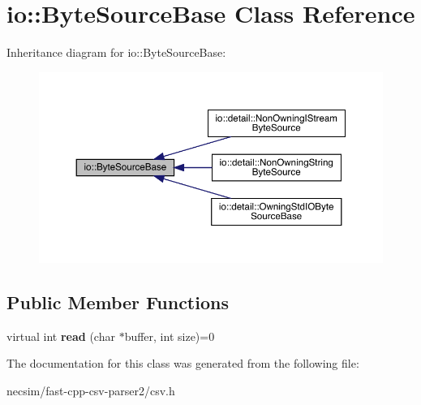 \hypertarget{classio_1_1_byte_source_base}{}\section{io\+:\+:Byte\+Source\+Base Class Reference}
\label{classio_1_1_byte_source_base}


Inheritance diagram for io\+:\+:Byte\+Source\+Base\+:\nopagebreak
\begin{figure}[H]
\begin{center}
\leavevmode
\includegraphics[width=350pt]{classio_1_1_byte_source_base__inherit__graph}
\end{center}
\end{figure}
\subsection*{Public Member Functions}
\begin{DoxyCompactItemize}
\item 
virtual int {\bfseries read} (char $\ast$buffer, int size)=0\hypertarget{classio_1_1_byte_source_base_a9598bcc869b79e44da07f0e6fa478615}{}\label{classio_1_1_byte_source_base_a9598bcc869b79e44da07f0e6fa478615}

\end{DoxyCompactItemize}


The documentation for this class was generated from the following file\+:\begin{DoxyCompactItemize}
\item 
necsim/fast-\/cpp-\/csv-\/parser2/csv.\+h\end{DoxyCompactItemize}
